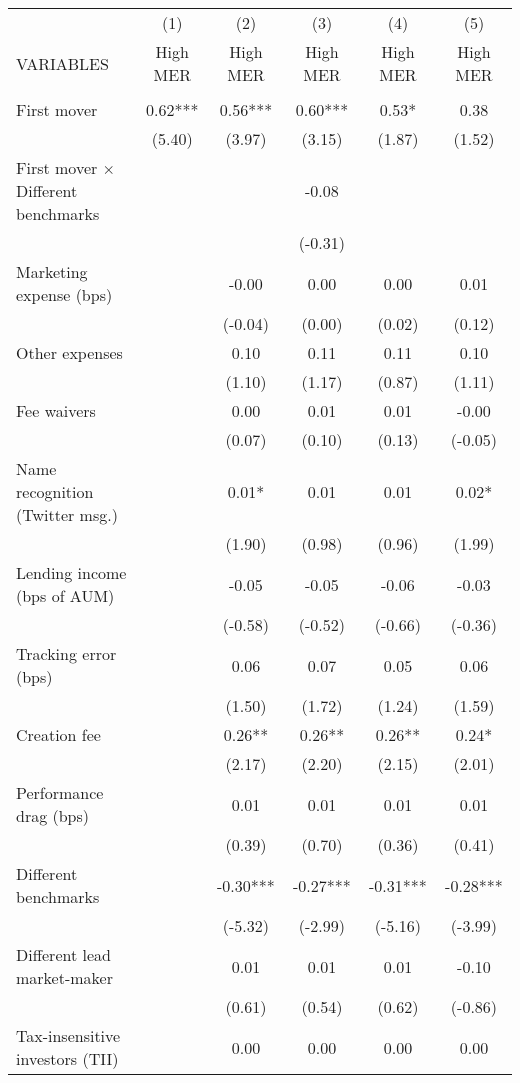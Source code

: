 \documentclass[]{article}
\begin{document}
\begin{tabular}{lccccc} \hline
 & (1) & (2) & (3) & (4) & (5) \\
VARIABLES & High MER & High MER & High MER & High MER & High MER \\ \hline
 &  &  &  &  &  \\
First mover & 0.62*** & 0.56*** & 0.60*** & 0.53* & 0.38 \\
 & (5.40) & (3.97) & (3.15) & (1.87) & (1.52) \\
First mover $\times$ Different benchmarks &  &  & -0.08 &  &  \\
 &  &  & (-0.31) &  &  \\
Marketing expense (bps) &  & -0.00 & 0.00 & 0.00 & 0.01 \\
 &  & (-0.04) & (0.00) & (0.02) & (0.12) \\
Other expenses &  & 0.10 & 0.11 & 0.11 & 0.10 \\
 &  & (1.10) & (1.17) & (0.87) & (1.11) \\
Fee waivers &  & 0.00 & 0.01 & 0.01 & -0.00 \\
 &  & (0.07) & (0.10) & (0.13) & (-0.05) \\
Name recognition (Twitter msg.) &  & 0.01* & 0.01 & 0.01 & 0.02* \\
 &  & (1.90) & (0.98) & (0.96) & (1.99) \\
Lending income (bps of AUM) &  & -0.05 & -0.05 & -0.06 & -0.03 \\
 &  & (-0.58) & (-0.52) & (-0.66) & (-0.36) \\
Tracking error (bps) &  & 0.06 & 0.07 & 0.05 & 0.06 \\
 &  & (1.50) & (1.72) & (1.24) & (1.59) \\
Creation fee &  & 0.26** & 0.26** & 0.26** & 0.24* \\
 &  & (2.17) & (2.20) & (2.15) & (2.01) \\
Performance drag (bps) &  & 0.01 & 0.01 & 0.01 & 0.01 \\
 &  & (0.39) & (0.70) & (0.36) & (0.41) \\
Different benchmarks &  & -0.30*** & -0.27*** & -0.31*** & -0.28*** \\
 &  & (-5.32) & (-2.99) & (-5.16) & (-3.99) \\
Different lead market-maker &  & 0.01 & 0.01 & 0.01 & -0.10 \\
 &  & (0.61) & (0.54) & (0.62) & (-0.86) \\
Tax-insensitive investors (TII) &  & 0.00 & 0.00 & 0.00 & 0.00 \\

\end{tabular}
\end{document}
